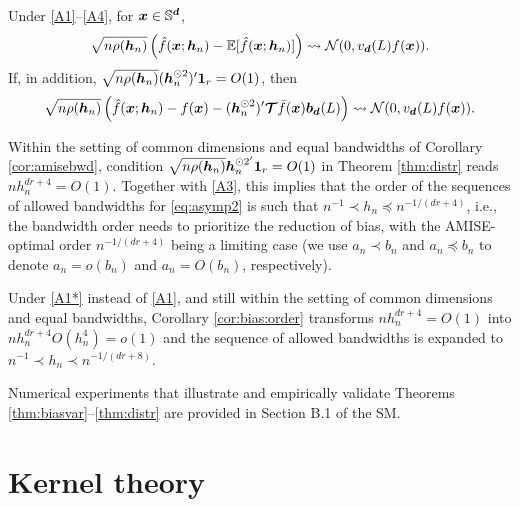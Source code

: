 \documentclass[oneside,11pt]{article}
\begin{document}
\begin{theorem}\label{thm:distr}
Under \ref{A1}--\ref{A4}, for $\boldsymbol{x}\in\mathbb{S}^{\boldsymbol{d}}$,
\begin{align}
    \sqrt{n\rho({\boldsymbol{h}}_n)}\left(\hat{f}(\boldsymbol{x};{\boldsymbol{h}}_n)-\mathbb{E}[\hat{f}(\boldsymbol{x};{\boldsymbol{h}}_n)]\right)\rightsquigarrow\mathcal{N}(0,v_{\boldsymbol{d}}(L)f(\boldsymbol{x})).\label{eq:asymp1}
\end{align}
If, in addition, $\sqrt{n\rho({\boldsymbol{h}}_n)}({\boldsymbol{h}}_n^{\odot 2})'\mathbf{1}_r=O(1)$, then
\begin{align}
    \sqrt{n\rho({\boldsymbol{h}}_n)}\left(\hat{f}(\boldsymbol{x};{\boldsymbol{h}}_n)-f(\boldsymbol{x})-({\boldsymbol{h}}_n^{\odot 2})'\boldsymbol{\mathcal{T}}\bar{f}(\boldsymbol{x})\boldsymbol{b}_{\boldsymbol{d}}(L)\right)\rightsquigarrow\mathcal{N}(0,v_{\boldsymbol{d}}(L)f(\boldsymbol{x})).\label{eq:asymp2}
\end{align}
\end{theorem}

\begin{remark} \label{rem:orders_norm1}
Within the setting of common dimensions and equal bandwidths of Corollary \ref{cor:amisebwd}, condition $\sqrt{n\rho({\boldsymbol{h}}_n)}{\boldsymbol{h}}^{\odot 2'}_n\mathbf{1}_r=O(1)$ in Theorem \ref{thm:distr} reads $nh_n^{dr+4}=O(1)$. Together with \ref{A3}, this implies that the order of the sequences of allowed bandwidths for \eqref{eq:asymp2} is such that $n^{-1}\prec h_n \preceq n^{-1/(dr+4)}$, i.e., the bandwidth order needs to prioritize the reduction of bias, with the AMISE-optimal order $n^{-1/(dr+4)}$ being a limiting case (we use $a_n\prec b_n$ and $a_n\preceq b_n$ to denote $a_n=o(b_n)$ and $a_n=O(b_n)$, respectively).
\end{remark}

\begin{remark} \label{rem:orders_norm2}
Under \ref{A1*} instead of \ref{A1}, and still within the setting of common dimensions and equal bandwidths, Corollary \ref{cor:bias:order} transforms $nh_n^{dr+4}=O(1)$ into $nh_n^{dr+4}O(h_n^4)=o(1)$ and the sequence of allowed bandwidths is expanded to $n^{-1}\prec h_n \prec n^{-1/(dr+8)}$.
\end{remark}

Numerical experiments that illustrate and empirically validate Theorems \ref{thm:biasvar}--\ref{thm:distr} are provided in Section B.1 of the SM.

\section{Kernel theory}
\label{sec:ker}

\end{document}
